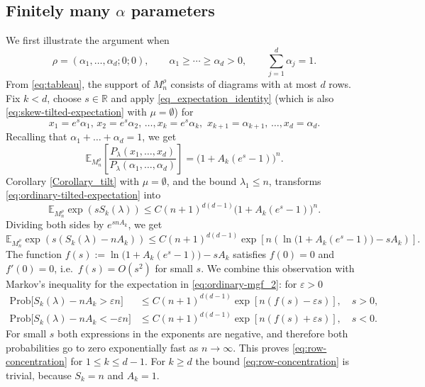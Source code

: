 \documentclass[11pt,reqno]{amsart}
\theoremstyle{definition}
\theoremstyle{remark}
\numberwithin{equation}{section}
\newcommand{\E}{\mathbb E}
\newcommand{\eps}{\varepsilon}
\begin{document}
\subsection{Finitely many $\alpha$ parameters}\label{sec:ordinary-example}
We first illustrate the argument when
\[
 \rho=(\alpha_1,\ldots,\alpha_d;0;0),\qquad
 \alpha_1\ge\cdots\ge\alpha_d>0,\qquad \sum_{j=1}^d\alpha_j=1.
\]
From \eqref{eq:tableau}, the support of $M^\rho_n$ consists of diagrams with at most $d$ rows. Fix $k<d$, choose $s\in\mathbb R$ and apply \eqref{eq_expectation_identity} (which is also \eqref{eq:skew-tilted-expectation} with $\mu=\emptyset$) for 
\begin{equation}
\label{eq_tilted_parameters}
 x_1=e^s \alpha_1,\,x_2=e^s \alpha_2,\,\dots,x_k=e^s \alpha_k,\,\, x_{k+1}=\alpha_{k+1},\, \dots, x_d=\alpha_d.
\end{equation}
Recalling that $\alpha_1+\dots+\alpha_d=1$, we get
\begin{equation}\label{eq:ordinary-tilted-expectation}
 \E_{M_n^\rho}\left[\frac{P_\lambda(x_1,\dots,x_d)}{P_\lambda(\alpha_1,\dots,\alpha_d)}\right]
 =\bigl(1+A_k(e^s-1)\bigr)^n.
\end{equation}
Corollary \ref{Corollary_tilt} with $\mu=\emptyset$, and the bound $\lambda_1\le n$, transforms
\eqref{eq:ordinary-tilted-expectation} into
\begin{equation*}
 \E_{M_n^\rho} \exp\left(sS_k(\lambda)\right)
 \le
 C(n+1)^{d(d-1)}\bigl(1+A_k(e^s-1)\bigr)^n.
\end{equation*}
Dividing both sides by $e^{sn A_k}$, we get
\begin{equation}\label{eq:ordinary-mgf_2}
 \E_{M_n^\rho}\exp\left(s(S_k(\lambda)-nA_k)\right)
 \le
 C(n+1)^{d(d-1)} \exp\left[n\left(\ln\bigl(1+A_k(e^s-1) \bigr) -sA_k\right)\right].
\end{equation}
The function $f(s):=\ln\bigl(1+A_k(e^s-1) \bigr) -sA_k$ satisfies $f(0)=0$ and $f'(0)=0$, i.e.\, $f(s)=O(s^2)$ for small $s$. We combine this observation with Markov's inequality for the expectation in \eqref{eq:ordinary-mgf_2}: for $\eps>0$
\begin{align*}
 \mathrm{Prob}\bigl[S_k(\lambda)-nA_k>\eps n\bigr]&\le  C(n+1)^{d(d-1)} \exp\left[n\left(f(s)-\eps s\right)\right], \quad s>0,\\
 \mathrm{Prob}\bigl[S_k(\lambda)-nA_k<-\eps n\bigr]&\le  C(n+1)^{d(d-1)} \exp\left[n\left(f(s)+\eps s\right)\right], \quad s<0.
\end{align*}
For small $s$ both expressions in the exponents are negative, and therefore both probabilities go to zero exponentially fast as $n\to\infty$. This proves \eqref{eq:row-concentration} for $1\le k \le d-1$. For $k\ge d$ the bound \eqref{eq:row-concentration} is trivial, because $S_k=n$ and $A_k=1$.
\end{document}
